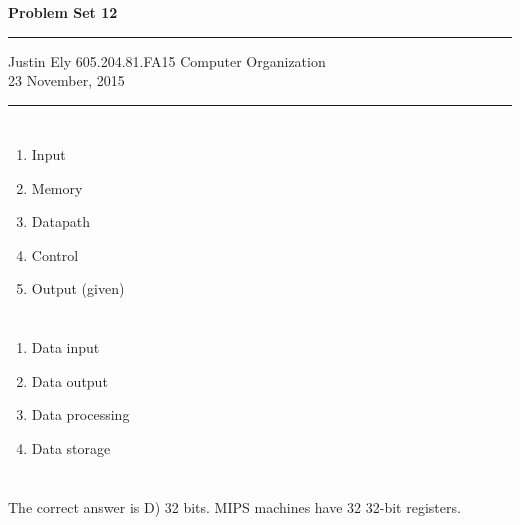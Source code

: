 \documentclass[a4paper,11pt]{article}
\begin{document}
\begin{flushright}

\vspace{1.1cm}

{\bf\Huge Problem Set 12}

\rule{0.25\linewidth}{0.5pt}

\vspace{0.5cm}
Justin Ely
\linebreak
\newline
\footnotesize{605.204.81.FA15 Computer Organization\\}
\vspace{0.5cm}
23 November, 2015
\end{flushright}

\noindent\rule{\linewidth}{1.0pt}



\section{}

\begin{enumerate}
    \item Input
    \item Memory
    \item Datapath
    \item Control
    \item Output (given)
\end{enumerate}


\section{}
\begin{enumerate}
    \item Data input
    \item Data output
    \item Data processing
    \item Data storage
\end{enumerate}



\section{}
The correct answer is D) 32 bits.  MIPS machines have 32 32-bit registers.
\end{document}
